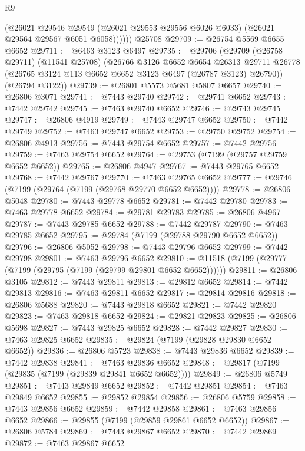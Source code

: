 \begin{lexlean}{R9}
\begin{coremodule}
            (@26021
              @29546
              @29549
              (@26021 @29553 @29556 @6026 @6033)
              (@26021 @29564 @29567 @6051 @6058))))))
    @25708
@29709 := @26754 @5569 @6655 @6652
@29711 := @6463 @3123 @6497
@29735 := @29706
    (@29709
      (@26758 @29711)
      (@11541 @25708)
      (@26766
        @3126
        @6652
        @6654
        @26313
        @29711
        @26778
        (@26765 @3124 @113 @6652 @6652 @3123 @6497 (@26787 @3123) @26790))
      (@26794 @3122))
@29739 := @26801 @5573 @5681 @5807 @6657
@29740 := @26806 @3071
@29741 := @7443 @29740
@29742 := @29741 @6652
@29743 := @7442 @29742
@29745 := @7463 @29740 @6652
@29746 := @29743 @29745
@29747 := @26806 @4919
@29749 := @7443 @29747 @6652
@29750 := @7442 @29749
@29752 := @7463 @29747 @6652
@29753 := @29750 @29752
@29754 := @26806 @4913
@29756 := @7443 @29754 @6652
@29757 := @7442 @29756
@29759 := @7463 @29754 @6652
@29764 := @29753 (@7199 (@29757 @29759 @6652 @6652))
@29765 := @26806 @4947
@29767 := @7443 @29765 @6652
@29768 := @7442 @29767
@29770 := @7463 @29765 @6652
@29777 := @29746 (@7199 (@29764 (@7199 (@29768 @29770 @6652 @6652))))
@29778 := @26806 @5048
@29780 := @7443 @29778 @6652
@29781 := @7442 @29780
@29783 := @7463 @29778 @6652
@29784 := @29781 @29783
@29785 := @26806 @4967
@29787 := @7443 @29785 @6652
@29788 := @7442 @29787
@29790 := @7463 @29785 @6652
@29795 := @29784 (@7199 (@29788 @29790 @6652 @6652))
@29796 := @26806 @5052
@29798 := @7443 @29796 @6652
@29799 := @7442 @29798
@29801 := @7463 @29796 @6652
@29810 := @11518 (@7199 (@29777 (@7199 (@29795 (@7199 (@29799 @29801 @6652 @6652))))))
@29811 := @26806 @3105
@29812 := @7443 @29811
@29813 := @29812 @6652
@29814 := @7442 @29813
@29816 := @7463 @29811 @6652
@29817 := @29814 @29816
@29818 := @26806 @5688
@29820 := @7443 @29818 @6652
@29821 := @7442 @29820
@29823 := @7463 @29818 @6652
@29824 := @29821 @29823
@29825 := @26806 @5698
@29827 := @7443 @29825 @6652
@29828 := @7442 @29827
@29830 := @7463 @29825 @6652
@29835 := @29824 (@7199 (@29828 @29830 @6652 @6652))
@29836 := @26806 @5723
@29838 := @7443 @29836 @6652
@29839 := @7442 @29838
@29841 := @7463 @29836 @6652
@29848 := @29817 (@7199 (@29835 (@7199 (@29839 @29841 @6652 @6652))))
@29849 := @26806 @5749
@29851 := @7443 @29849 @6652
@29852 := @7442 @29851
@29854 := @7463 @29849 @6652
@29855 := @29852 @29854
@29856 := @26806 @5759
@29858 := @7443 @29856 @6652
@29859 := @7442 @29858
@29861 := @7463 @29856 @6652
@29866 := @29855 (@7199 (@29859 @29861 @6652 @6652))
@29867 := @26806 @5784
@29869 := @7443 @29867 @6652
@29870 := @7442 @29869
@29872 := @7463 @29867 @6652

\end{coremodule}
\end{lexlean}
